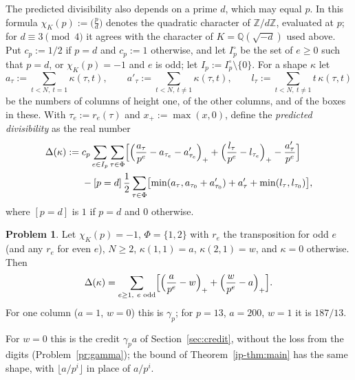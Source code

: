 \documentclass[reqno]{amsart}
\theoremstyle{definition}
\newtheorem{problem}{Problem}[section]
\theoremstyle{plain}
\newcommand{\Z}{\mathbb{Z}}
\newcommand{\Q}{\mathbb{Q}}
\begin{document}
The predicted divisibility also depends on a prime \(d\), which may equal \(p\).  In this formula \(\chi_K(p) := \bigl(\frac{p}{d}\bigr)\) denotes the quadratic character of \(\Z/d\Z\), evaluated at \(p\); for \(d \equiv 3 \pmod 4\) it agrees with the character of \(K = \Q(\sqrt{-d})\) used above.  Put \(c_p := 1/2\) if \(p = d\) and \(c_p := 1\) otherwise, and let \(I_p^\circ\) be the set of \(e \ge 0\) such that \(p = d\), or \(\chi_K(p) = -1\) and \(e\) is odd; let \(I_p := I_p^\circ \setminus \{0\}\).  For a shape \(\kappa\) let
\[
  a_\tau := \sum_{t < N,\ t = 1} \kappa(\tau, t), \qquad
  a'_\tau := \sum_{t < N,\ t \ne 1} \kappa(\tau, t), \qquad
  l_\tau := \sum_{t < N,\ t \ne 1} t\, \kappa(\tau, t)
\]
be the numbers of columns of height one, of the other columns, and of the boxes in these.  With \(\tau_e := r_e(\tau)\) and \(x_+ := \max(x, 0)\), define the \emph{predicted divisibility} as the real number
\[
\begin{aligned}
  \Delta(\kappa) :={}& c_p \sum_{e \in I_p} \sum_{\tau \in \Phi} \Bigl[ \Bigl(\frac{a_\tau}{p^e} - a_{\tau_e} - a'_{\tau_e}\Bigr)_+ + \Bigl(\frac{l_\tau}{p^e} - l_{\tau_e}\Bigr)_+ - \frac{a'_\tau}{p^e} \Bigr] \\
  &- [p = d]\, \frac12 \sum_{\tau \in \Phi} \bigl[ \min(a_\tau, a_{\tau_0} + a'_{\tau_0}) + a'_\tau + \min(l_\tau, l_{\tau_0}) \bigr],
\end{aligned}
\]
where \([p = d]\) is \(1\) if \(p = d\) and \(0\) otherwise.

\begin{problem}\label{pr:predicted}
Let \(\chi_K(p) = -1\), \(\Phi = \{1, 2\}\) with \(r_e\) the transposition for odd \(e\) (and any \(r_e\) for even \(e\)), \(N \ge 2\), \(\kappa(1, 1) = a\), \(\kappa(2, 1) = w\), and \(\kappa = 0\) otherwise.  Then
\[
  \Delta(\kappa) = \sum_{e \ge 1,\ e \text{ odd}} \Bigl[ \Bigl(\frac{a}{p^e} - w\Bigr)_+ + \Bigl(\frac{w}{p^e} - a\Bigr)_+ \Bigr] .
\]
For one column (\(a = 1\), \(w = 0\)) this is \(\gamma_p\); for \(p = 13\), \(a = 200\), \(w = 1\) it is \(187/13\).
\end{problem}

For \(w = 0\) this is the credit \(\gamma_p a\) of Section~\ref{sec:credit}, without the loss from the digits (Problem~\ref{pr:gamma}); the bound of Theorem~\ref{ip-thm:main} has the same shape, with \(\lfloor a/p^i \rfloor\) in place of \(a/p^i\).
\end{document}
